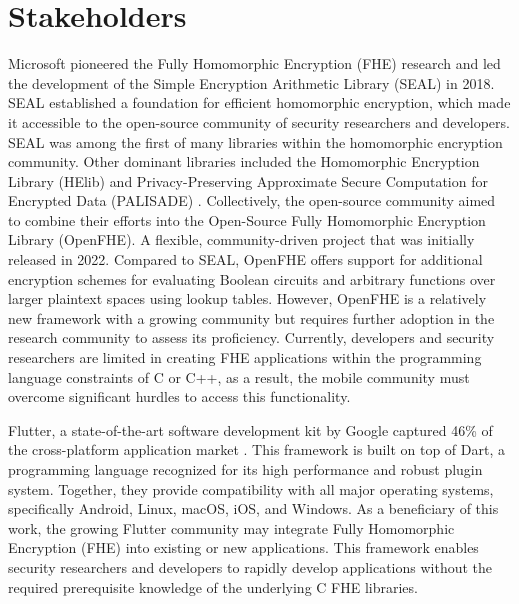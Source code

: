 \section{Stakeholders}
Microsoft pioneered the Fully Homomorphic Encryption (FHE) research and led the development of the Simple Encryption Arithmetic Library (SEAL) in 2018. SEAL established a foundation for efficient homomorphic encryption, which made it accessible to the open-source community of security researchers and developers. SEAL was among the first of many libraries within the homomorphic encryption community. Other dominant libraries included the Homomorphic Encryption Library (HElib) \cite{HElib} and Privacy-Preserving Approximate Secure Computation for Encrypted Data (PALISADE) \cite{PALISADE}. Collectively, the open-source community aimed to combine their efforts into the Open-Source Fully Homomorphic Encryption Library (OpenFHE). A flexible, community-driven project that was initially released in 2022. Compared to SEAL, OpenFHE offers support for additional encryption schemes for evaluating Boolean circuits and arbitrary functions over larger plaintext spaces using lookup tables. However, OpenFHE is a relatively new framework with a growing community but requires further adoption in the research community to assess its proficiency. Currently, developers and security researchers are limited in creating FHE applications within the programming language constraints of C or C++, as a result, the mobile community must overcome significant hurdles to access this functionality.

Flutter, a state-of-the-art software development kit by Google captured 46\% of the cross-platform application market \cite{vailshery-flutter-statista}. This framework is built on top of Dart, a programming language recognized for its high performance and robust plugin system. Together, they provide compatibility with all major operating systems, specifically Android, Linux, macOS, iOS, and Windows. As a beneficiary of this work, the growing Flutter community may integrate Fully Homomorphic Encryption (FHE) into existing or new applications. This framework enables security researchers and developers to rapidly develop applications without the required prerequisite knowledge of the underlying C FHE libraries.
